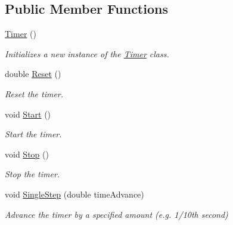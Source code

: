 \subsection*{Public Member Functions}
\begin{DoxyCompactItemize}
\item 
\hyperlink{class_microsoft_1_1_samples_1_1_kinect_1_1_avateering_1_1_filters_1_1_timer_a49aa7ad43a8e706a066e0024f661ee44}{Timer} ()
\begin{DoxyCompactList}\small\item\em Initializes a new instance of the \hyperlink{class_microsoft_1_1_samples_1_1_kinect_1_1_avateering_1_1_filters_1_1_timer}{Timer} class. \end{DoxyCompactList}\item 
double \hyperlink{class_microsoft_1_1_samples_1_1_kinect_1_1_avateering_1_1_filters_1_1_timer_a938e1304e5e4aaa916a5ef010ff8fc28}{Reset} ()
\begin{DoxyCompactList}\small\item\em Reset the timer. \end{DoxyCompactList}\item 
void \hyperlink{class_microsoft_1_1_samples_1_1_kinect_1_1_avateering_1_1_filters_1_1_timer_a463741040cda49273475a5722322b73d}{Start} ()
\begin{DoxyCompactList}\small\item\em Start the timer. \end{DoxyCompactList}\item 
void \hyperlink{class_microsoft_1_1_samples_1_1_kinect_1_1_avateering_1_1_filters_1_1_timer_a018da7ed7832a2257569dd87e68e6137}{Stop} ()
\begin{DoxyCompactList}\small\item\em Stop the timer. \end{DoxyCompactList}\item 
void \hyperlink{class_microsoft_1_1_samples_1_1_kinect_1_1_avateering_1_1_filters_1_1_timer_a02e586f1d448e09be37c47a28791d0fc}{Single\+Step} (double time\+Advance)
\begin{DoxyCompactList}\small\item\em Advance the timer by a specified amount (e.\+g. 1/10th second) \end{DoxyCompactList}\end{DoxyCompactItemize}
